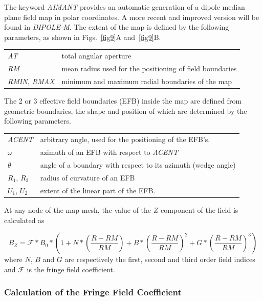 The keyword \textsl{AIMANT} provides an automatic
generation of a dipole median plane field map in polar coordinates. A more recent and improved version will be 
found in \textsl{DIPOLE-M}. The extent of the map is defined by the 
following parameters, as shown in Figs.~\ref{fig9}A and~\ref{fig9}B. 

 \begin{tabular}{>{\sl}l!{~:}l}
	 AT &  total angular aperture\\
	 RM & mean radius used for the positioning of field boundaries\\
	 RMIN, RMAX
	    &  minimum and maximum radial boundaries of the map 
 \end{tabular}
\bigskip

\noindent The 2 or 3 effective field boundaries (EFB) inside the map are
defined from  geometric boundaries, the shape and position of which are determined by the 
following parameters.  


\begin{tabular}{l!{~:}l}
	 \textsl{ACENT} 
	    & arbitrary  angle, used for the positioning of the EFB's. \\
	$\omega$ &  azimuth of an EFB with respect to  \textsl{ACENT}\\
	$\theta$ & angle of a boundary with respect to its azimuth (wedge angle)\\ 
	$R_1$, $R_2$  &  radius of curvature of an EFB\\
	$U_1$, $U_2$  &  extent of the linear part of the EFB. 
\end{tabular}
\bigskip

\noindent At  any node  of the map mesh, the value of the $Z$ 
component of the field is calculated as 

 \begin{equation}
	 B_Z =  \mathcal{F} \ast  B_0 \ast  
	      \left(1+N \ast  
	           \left( \frac{R-RM }{ RM}\right) 
	           + B \ast  \left(\frac{R-RM }{ RM} \right)^2 
	           + G \ast  \left(\frac{R-RM }{ RM} \right)^3 
	      \right) 
 	\label{eq4-4-1}
 \end{equation}
%
 where  $ N$, $B $ and $ G $ are  respectively  the first, second and
third order field indices and $ \mathcal{F}$ is the fringe field 
coefficient. 


\subsubsection*{Calculation of the Fringe Field Coefficient} 

